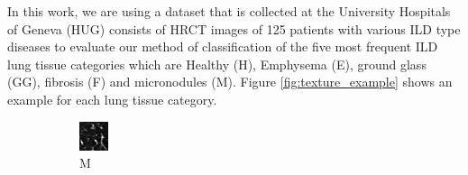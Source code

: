 \documentclass[conference]{IEEEtran}
\begin{document}
In this work, we are using a dataset that is collected at the University Hospitals of Geneva (HUG) \cite{dataset} consists of HRCT images of 125 patients with various ILD type diseases to evaluate our method of classification of the five most frequent ILD lung tissue categories which are Healthy (H), Emphysema (E), ground glass (GG), fibrosis (F) and micronodules (M). Figure \ref{fig:texture_example} shows an example for each lung tissue category.

\begin{figure}[tbh]
  \centering
  \begin{subfigure}{0.092\textwidth}
    \centering
    \includegraphics[width=\linewidth]{images/micronodules.png}
    \caption{M}
  \end{subfigure}
  \centering
  \begin{subfigure}{0.092\textwidth}
    \centering

\end{subfigure}
\end{figure}
\end{document}
